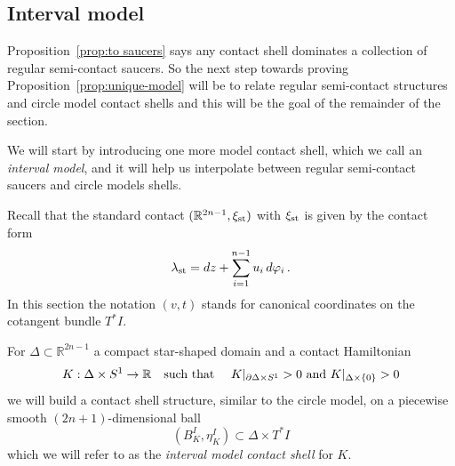\documentclass[12pt]{paper}
\theoremstyle{plain}
\theoremstyle{definition}
\newcommand{\R}{{\mathbb{R}}}
\newcommand{\st}{{\rm st}}
\numberwithin{figure}{section}
\begin{document}
    
   
   
   


 

 
 
 

 
 
\subsection{Interval model}

Proposition~\ref{prop:to saucers} says any contact shell dominates a collection of regular semi-contact saucers.  So the next step
towards proving Proposition~\ref{prop:unique-model} will be to relate regular semi-contact structures and circle model contact shells
and this will be the goal of the remainder of the section.

We will start by introducing one more model contact shell, which we call an {\em interval model}, and it will help us interpolate between regular semi-contact saucers and circle models shells.
  
 
Recall that  the standard contact $(\R^{2n-1}, \xi_{\st})$ with $\xi_\st$ is 
given by the contact form 
$$\lambda_\st = dz + \sum_{i=1}^{n-1} u_i \,d\varphi_i\,.$$
In this section the notation $(v,t)$ stands for 
 canonical coordinates on the cotangent  bundle  $T^*I$.

For $\Delta \subset \R^{2n-1}$ a compact star-shaped domain and a contact Hamiltonian
 \begin{equation}\label{e:KBoundaryInterval}
	K: \Delta \times S^1 \to \R \quad\mbox{such that \quad $K|_{\partial \Delta \times S^1} > 0$ and $K|_{\Delta \times \{0\}} > 0$}
\end{equation}
we will build a contact shell structure, similar to the circle model,
on a piecewise smooth $(2n+1)$-dimensional ball 
$$(B^{I}_K, \eta_K^{I}) \subset \Delta \times T^*I$$
which we will refer to as the \emph{interval model contact shell} for $K$.
\end{document}

